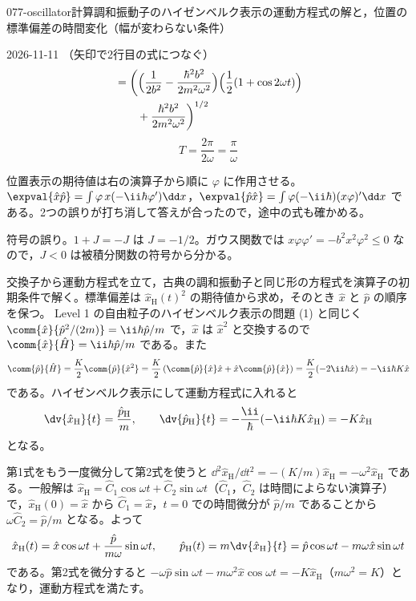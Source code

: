 \documentclass[uplatex,dvipdfmx,a4paper,11pt]{jsarticle}
\begin{document}
\begin{mondai}{077-oscillator}{計算}{調和振動子のハイゼンベルク表示の運動方程式の解と，位置の標準偏差の時間変化（幅が変わらない条件）}
\begin{kotaeutsushi}{2026-11-11}
（矢印で2行目の式につなぐ）
\begin{align*}
&=\biggl(\Bigl(\frac{1}{2b^{2}}-\frac{\hbar^{2}b^{2}}{2m^{2}\omega^{2}}\Bigr)\Bigl(\frac{1}{2}(1+\cos2\omega t)\Bigr)\\
&\qquad+\frac{\hbar^{2}b^{2}}{2m^{2}\omega^{2}}\biggr)^{1/2}
\end{align*}
\[ T=\frac{2\pi}{2\omega}=\frac{\pi}{\omega} \]
\end{kotaeutsushi}
\begin{kizuki}
\item 位置表示の期待値は右の演算子から順に $\varphi$ に作用させる。$\expval{\hat{x}\hat{p}}=\int\varphi\,x(-\ii\hbar\varphi')\dd x$，$\expval{\hat{p}\hat{x}}=\int\varphi(-\ii\hbar)(x\varphi)'\dd x$ である。2つの誤りが打ち消して答えが合ったので，途中の式も確かめる。
\item {} 符号の誤り。$1+J=-J$ は $J=-1/2$。ガウス関数では $x\varphi\varphi'=-b^{2}x^{2}\varphi^{2}\le0$ なので，$J<0$ は被積分関数の符号から分かる。
\end{kizuki}
\begin{tadashii}
\houshin 交換子から運動方程式を立て，古典の調和振動子と同じ形の方程式を演算子の初期条件で解く。標準偏差は $\hat{x}_{\mathrm{H}}(t)^{2}$ の期待値から求め，そのとき $\hat{x}$ と $\hat{p}$ の順序を保つ。
\keisan {} Level 1 の自由粒子のハイゼンベルク表示の問題 (1) と同じく $\comm{\hat{x}}{\hat{p}^{2}/(2m)}=\ii\hbar\hat{p}/m$ で，$\hat{x}$ は $\hat{x}^{2}$ と交換するので $\comm{\hat{x}}{\hat{H}}=\ii\hbar\hat{p}/m$ である。また
\[ \comm{\hat{p}}{\hat{H}}=\frac{K}{2}\comm{\hat{p}}{\hat{x}^{2}}=\frac{K}{2}\left(\comm{\hat{p}}{\hat{x}}\hat{x}+\hat{x}\comm{\hat{p}}{\hat{x}}\right)=\frac{K}{2}(-2\ii\hbar\hat{x})=-\ii\hbar K\hat{x} \]
である。ハイゼンベルク表示にして運動方程式に入れると
\[ \dv{\hat{x}_{\mathrm{H}}}{t}=\frac{\hat{p}_{\mathrm{H}}}{m},\qquad \dv{\hat{p}_{\mathrm{H}}}{t}=-\frac{\ii}{\hbar}(-\ii\hbar K\hat{x}_{\mathrm{H}})=-K\hat{x}_{\mathrm{H}} \]
となる。

 第1式をもう一度微分して第2式を使うと $\dd^{2}\hat{x}_{\mathrm{H}}/\dd t^{2}=-(K/m)\hat{x}_{\mathrm{H}}=-\omega^{2}\hat{x}_{\mathrm{H}}$ である。一般解は $\hat{x}_{\mathrm{H}}=\hat{C}_{1}\cos\omega t+\hat{C}_{2}\sin\omega t$（$\hat{C}_{1}$，$\hat{C}_{2}$ は時間によらない演算子）で，$\hat{x}_{\mathrm{H}}(0)=\hat{x}$ から $\hat{C}_{1}=\hat{x}$，$t=0$ での時間微分が $\hat{p}/m$ であることから $\omega\hat{C}_{2}=\hat{p}/m$ となる。よって
\[ \hat{x}_{\mathrm{H}}(t)=\hat{x}\cos\omega t+\frac{\hat{p}}{m\omega}\sin\omega t,\qquad \hat{p}_{\mathrm{H}}(t)=m\dv{\hat{x}_{\mathrm{H}}}{t}=\hat{p}\cos\omega t-m\omega\hat{x}\sin\omega t \]
である。第2式を微分すると $-\omega\hat{p}\sin\omega t-m\omega^{2}\hat{x}\cos\omega t=-K\hat{x}_{\mathrm{H}}$（$m\omega^{2}=K$）となり，運動方程式を満たす。


\end{tadashii}
\end{mondai}
\end{document}

